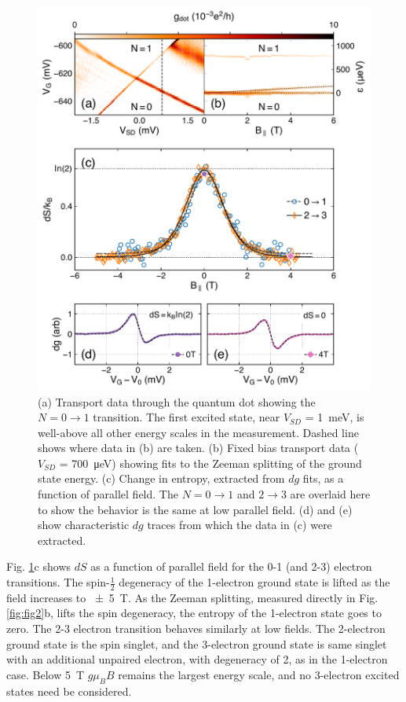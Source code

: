 \documentclass[twocolumn,showpacs,preprintnumbers,amsmath,amssymb,pra,aps,superscriptaddress]{revtex4-1}
\begin{document}
\begin{figure}
        \includegraphics[width=1.0\columnwidth]{../figures/figure_3.pdf}
        \caption{\label{fig:fig3}(a) Transport data through the quantum dot showing the $N=0 \rightarrow 1$ transition. The first excited state, near $V_{SD}$ = \SI{1}{\milli\electronvolt}, is well-above all other energy scales in the measurement. Dashed line shows where data in (b) are taken. (b) Fixed bias transport data ($V_{SD}$ = \SI{700}{\micro\electronvolt}) showing fits to the Zeeman splitting of the ground state energy. (c) Change in entropy, extracted from $dg$ fits, as a function of parallel field. The $N=0 \rightarrow 1$ and $2 \rightarrow 3$ are overlaid here to show the behavior is the same at low parallel field. (d) and (e) show characteristic $dg$ traces from which the data in (c) were extracted.}
\end{figure}

Fig. \ref{fig:fig3}c shows $dS$ as a function of parallel field for the 0-1 (and 2-3) electron transitions. The spin-$\frac{1}{2}$ degeneracy of the 1-electron ground state is lifted as the field increases to \SI{\pm5}{\tesla}.  As the Zeeman splitting, measured directly in Fig. \ref{fig:fig2}b, lifts the spin degeneracy, the entropy of the 1-electron state goes to zero. The 2-3 electron transition behaves similarly at low fields.  The 2-electron ground state is the spin singlet, and the 3-electron ground state is same singlet with an additional unpaired electron, with degeneracy of 2, as in the 1-electron case. Below \SI{5}{\tesla} $g\mu_B B$ remains the largest energy scale, and no 3-electron excited states need be considered.
\end{document}
